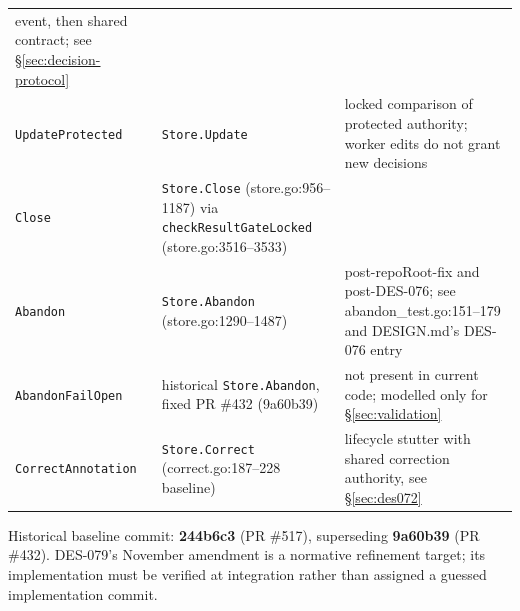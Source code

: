 \documentclass[a4paper,10pt,fleqn]{article}
\newcommand{\field}[1]{\ifmmode\texttt{#1}\else\texorpdfstring{\breakfield{#1}}{#1}\fi}
\begin{document}
\begin{longtable}{@{}>{\raggedright\arraybackslash}p{}>{\raggedright\arraybackslash}p{}>{\raggedright\arraybackslash}p{}@{}}
  event, then shared contract; see \S\ref{sec:decision-protocol} \\
\field{UpdateProtected} & \field{Store.Update} & locked comparison of
  protected authority; worker edits do not grant new decisions \\
\field{Close} & \field{Store.Close} (store.go:956--1187) via
  \field{checkResultGateLocked} (store.go:3516--3533) & \\
\field{Abandon} & \field{Store.Abandon} (store.go:1290--1487) &
  post-repoRoot-fix and post-DES-076; see abandon\_test.go:151--179
  and DESIGN.md's DES-076 entry \\
\field{AbandonFailOpen} & historical \field{Store.Abandon}, fixed
  PR \#432 (9a60b39) & not present in current code; modelled only
  for \S\ref{sec:validation} \\
\field{CorrectAnnotation} & \field{Store.Correct}
  (correct.go:187--228 baseline) & lifecycle stutter with shared
  correction authority, see
  \S\ref{sec:des072} \\
\end{longtable}

Historical baseline commit: \textbf{244b6c3} (PR \#517), superseding
\textbf{9a60b39} (PR \#432). DES-079's November amendment is a
normative refinement target; its implementation must be verified at
integration rather than assigned a guessed implementation commit.
\end{document}
